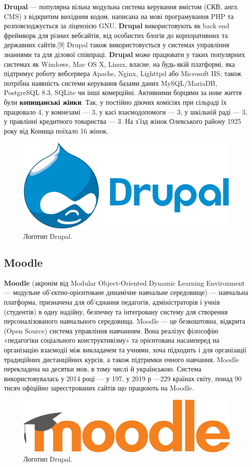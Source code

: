 \textbf{Drupal}  — популярна вільна модульна система керування вмістом (СКВ, англ. CMS) з відкритим вихідним кодом, написана на мові програмування PHP та розповсюджується за ліцензією GNU.
\textbf{Drupal} використовують як back end фреймворк для різних вебсайтів, від особистих блогів до корпоративних та державних сайтів.[9] Drupal також використовується у системах управління знаннями та для ділової співпраці.
\textbf{Drupal} може працювати у таких популярних системах як Windows, Mac OS X, Linux, власне, на будь-якій платформі, яка підтримує роботу вебсервера Apache, Nginx, Lighttpd або Microsoft IIS; також потрібна наявність системи керування базами даних MySQL/MariaDB, PostgreSQL 8.3, SQLite чи інші комерційні. 
Активними борцями за нове життя були \textbf{копищанські жінки}. Так, у постійно діючих комісіях при сільраді їх працювало 4, у комнезамі — 3, у касі взаємодопомоги — 3, у шкільній раді — 3, у правлінні кредитного товариства — 3. На з’їзд жінок Олевського району 1925 року від Конища поїхало 16 жінок.
\begin{figure}[h]
	\centering
	\includegraphics[width=0.5\linewidth]{./images-viktor/drupal.png}
	\caption{
		\centering
		Логотип Drupal.}
\end{figure}

\subsection{Moodle}

\textbf{Moodle} (акронім від Modular Object-Oriented Dynamic Learning Environment — модульне об'єктно-орієнтоване динамічне навчальне середовище) — навчальна платформа, призначена для об'єднання педагогів, адміністраторів і учнів (студентів) в одну надійну, безпечну та інтегровану систему для створення персоналізованого навчального середовища.
Moodle — це безкоштовна, відкрита (Open Source) система управління навчанням. Вона реалізує філософію «педагогіки соціального конструктивізму» та орієнтована насамперед на організацію взаємодії між викладачем та учнями, хоча підходить і для організації традиційних дистанційних курсів, а також підтримки очного навчання.
Moodle перекладена на десятки мов, в тому числі й українською. Система використовувалась у 2014 році — у 197, у 2019 р —229 країнах світу, понад 90 тисяч офіційно зареєстрованих сайтів що працюють на Moodle.
\begin{figure}[h]
	\centering
	\includegraphics[width=0.5\linewidth]{./images-viktor/moodle.png}
	\caption{
		\centering
		Логотип Drupal.}
\end{figure}






